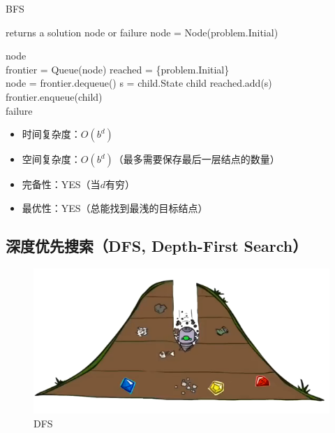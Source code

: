 \begin{algorithm}[H]
    \caption{BFS}
    \begin{algorithmic}[1]
         returns a solution node or failure
        \State node = Node(problem.Initial)

        \State \Return node
        \EndIf
        \\
        \State frontier = Queue(node)
        \State reached = \{problem.Initial\}
        \\
        \State node = frontier.dequeue()
        \State s = child.State
        \State \Return child
        \EndIf
        \State reached.add(s)
        \State frontier.enqueue(child)
        \EndIf
        \EndFor
        \EndWhile
        \\
        \State \Return failure
        \EndProcedure
    \end{algorithmic}
\end{algorithm}

\begin{itemize}
    \item 时间复杂度：$ O(b^d) $
    \item 空间复杂度：$ O(b^d) $（最多需要保存最后一层结点的数量）
    \item 完备性：YES（当$ d $有穷）
    \item 最优性：YES（总能找到最浅的目标结点）
\end{itemize}

\vspace{0.5cm}

\subsection{深度优先搜索（DFS, Depth-First Search）}

\begin{figure}[H]
    \centering
    \includegraphics{img/Chapter1/1-4/2.png}
    \caption{DFS}
\end{figure}

